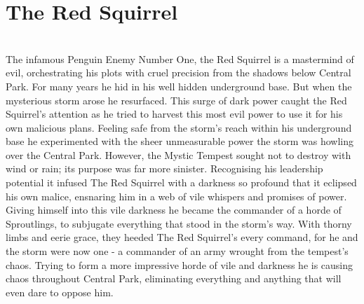 \section*{The Red Squirrel}
\label{sec:RedSquirrel}\hfill\\
The infamous Penguin Enemy Number One, the Red Squirrel is a mastermind of evil, orchestrating his plots with cruel precision from the shadows below Central Park. For many years he hid in his well hidden underground base. But when the mysterious storm arose he resurfaced. This surge of dark power caught the Red Squirrel's attention as he tried to harvest this most evil power to use it for his own malicious plans. Feeling safe from the storm's reach within his underground base he experimented with the sheer unmeasurable power the storm was howling over the Central Park. However, the Mystic Tempest sought not to destroy with wind or rain; its purpose was far more sinister. Recognising his leadership potential it infused The Red Squirrel with a darkness so profound that it eclipsed his own malice, ensnaring him in a web of vile whispers and promises of power. Giving himself into this vile darkness he became the commander of a horde of Sproutlings, to subjugate everything that stood in the storm's way. With thorny limbs and eerie grace, they heeded The Red Squirrel's every command, for he and the storm were now one - a commander of an army wrought from the tempest's chaos. Trying to form a more impressive horde of vile and darkness he is causing chaos throughout Central Park, eliminating everything and anything that will even dare to oppose him.
\vfill\eject
\vspace*{6.5cm}\hfill\\
